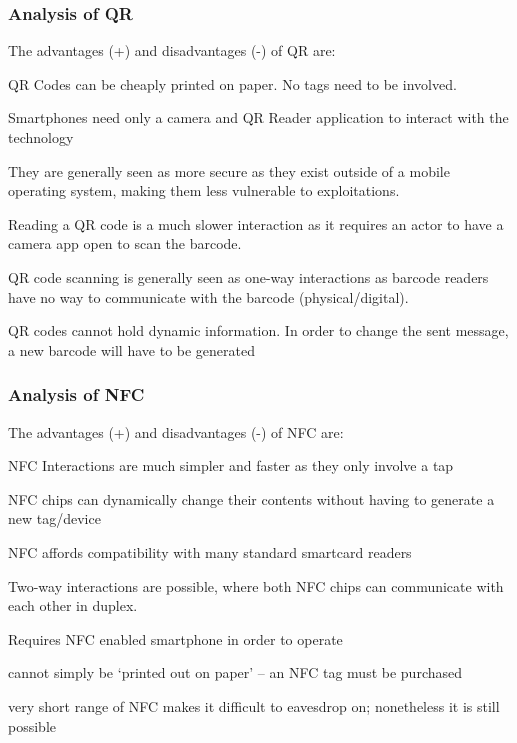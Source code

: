 \subsubsection{Analysis of QR}
The advantages (+) and disadvantages (-) of QR are: 
\begin{description}[leftmargin=!,labelwidth=\widthof{\bfseries small}]
	\item[+] QR Codes can be cheaply printed on paper. No tags need to be involved.
	\item[+] Smartphones need only a camera and QR Reader application to interact with the technology
	\item[+] They are generally seen as more secure as they exist outside of a mobile operating system, making them less vulnerable to exploitations.  
	\item[---] Reading a QR code is a much slower interaction as it requires an actor to have a camera app open to scan the barcode. 
	\item[---] QR code scanning is generally seen as one-way interactions as barcode readers have no way to communicate with the barcode (physical/digital).
	\item[---] QR codes cannot hold dynamic information. In order to change the sent message, a new barcode will have to be generated
\end{description}

\newpage
\subsubsection{Analysis of NFC}
The advantages (+) and disadvantages (-) of NFC are: 
\begin{description}[leftmargin=!,labelwidth=\widthof{\bfseries small}]
    \item[+] NFC Interactions are much simpler and faster as they only involve a tap
    \item[+] NFC chips can dynamically change their contents without having to generate a new tag/device
    \item[+] NFC affords compatibility with many standard smartcard readers
    \item[+] Two-way interactions are possible, where both NFC chips can communicate with each other in duplex. 
    \item[---] Requires NFC enabled smartphone in order to operate
    \item[---] cannot simply be `printed out on paper' -- an NFC tag must be purchased
    \item[---] very short range of NFC makes it difficult to eavesdrop on; nonetheless it is still possible
\end{description}

